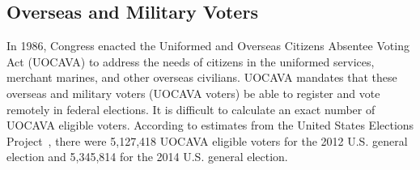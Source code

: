 \subsection{Overseas and Military Voters}
In 1986, Congress enacted the Uniformed and Overseas Citizens Absentee
Voting Act (UOCAVA) to address the needs of citizens in the uniformed
services, merchant marines, and other overseas civilians. UOCAVA
mandates that these overseas and military voters (UOCAVA voters) be
able to register and vote remotely in federal elections. It is
difficult to calculate an exact number of UOCAVA eligible
voters. According to estimates from the United States Elections
Project~\cite{USElectionsProject}, there were 5,127,418 UOCAVA
eligible voters for the 2012 U.S. general election and 5,345,814 for
the 2014 U.S. general election.



